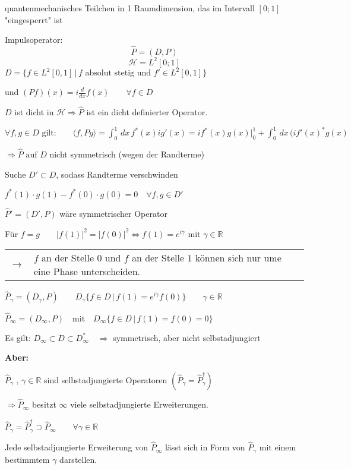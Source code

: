 \begin{Bsp}{quantenmechanisches Teilchen in 1 Raumdimension, das im Intervall $[0;1]$ "eingesperrt" ist}

    Impulsoperator:
    $$\hat{P} = (D,P)$$
    $$\mathcal{H} = L^2[0;1]$$
    $D = \{f \in L^2[0,1] \, | \, f \textrm{ absolut stetig und } f' \in L^2[0,1]\}$

    und $(Pf)(x) = i\frac{d}{dx} f(x) \qquad \forall f \in D$

    $D$ ist dicht in $\mathcal{H} \Rightarrow \hat{P}$ ist ein dicht definierter Operator.

    $\forall f,g \in D \textrm{ gilt:} \qquad \langle f,Pg \rangle = \int_0^1 \,dx\, f^\ast(x) i g'(x)
        = if^\ast(x)g(x) |_0^1 + \int_0^1 \,dx \, (if'(x)^\ast g(x)$

    $\Rightarrow \hat{P} \textrm{ auf } D$ nicht symmetrisch (wegen der Randterme)

    Suche $D' \subset D$, sodass Randterme verschwinden

    $f^\ast(1) \cdot g(1) - f^\ast(0) \cdot g(0) = 0 \quad \forall f,g \in D'$

    $\hat{P}' = (D',P)$ wäre symmetrischer Operator

    Für $f = g \qquad \vert f(1) \vert ^2 = \vert f(0) \vert ^2 \Leftrightarrow f(1) = e^{i \gamma}
        \textrm{ mit } \gamma \in \mathbb{R}$

    \begin{tabular}{ll}
       $\rightarrow$ & $f$ an der Stelle $0$ und $f$ an der Stelle $1$ können sich nur ume eine
                        Phase unterscheiden.
    \end{tabular}
    
    $\hat{P}_\gamma = (D_\gamma , P) \qquad D_\gamma \{f \in D \, | \, f(1) = e^{i \gamma} f(0)\} \qquad                \gamma \in \mathbb{R}$


    $\hat{P}_\infty = (D_\infty , P) \quad \textrm{mit} \quad D_\infty \{f \in D \, | \, f(1) = f(0) = 0 \}$

    Es gilt: $D_\infty \subset D \subset D_\infty^\ast \quad \Rightarrow$ symmetrisch, aber nicht   selbstadjungiert

    \textbf{Aber:}
    \begin{addmargin}[25pt]{0pt}
        $\hat{P}_\gamma \textrm{ , } \gamma \in \mathbb{R}$ sind selbstadjungierte Operatoren 
            $\left( \hat{P}_\gamma = \hat{P}_\gamma^\dagger \right)$

        $\Rightarrow \hat{P}_\infty$ besitzt $\infty$ viele selbstadjungierte Erweiterungen.

        $\hat{P}_\gamma = \hat{P}_\gamma^\dagger \supset \hat{P}_\infty \qquad \forall \gamma \in
            \mathbb{R}$

        Jede selbstadjungierte Erweiterung von $\hat{P}_\infty$ lässt sich in Form von $\hat{P}_\gamma$
        mit einem bestimmtem $\gamma$ darstellen.
    \end{addmargin}

\end{Bsp}



